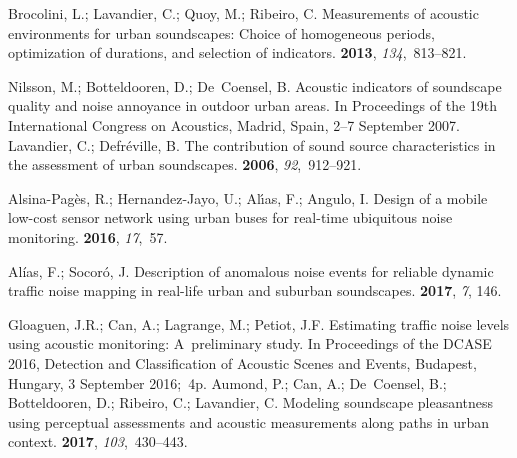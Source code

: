 \documentclass[sensors,article,accept,moreauthors,pdftex,10pt,a4paper]{mdpi}
\begin{document}
\begin{thebibliography}{999}
Brocolini, L.; Lavandier, C.; Quoy, M.; Ribeiro, C.
\newblock Measurements of acoustic environments for urban soundscapes: Choice
  of homogeneous periods, optimization of durations, and selection of
  indicators.
 {\bf 2013}, {\em 134},~813--821.

Nilsson, M.; Botteldooren, D.; De~Coensel, B.
\newblock Acoustic indicators of soundscape quality and noise annoyance in
  outdoor urban areas.
\newblock  In Proceedings of the 19th International Congress on Acoustics, {Madrid, Spain, 2--7 September} 2007.
Lavandier, C.; Defr{\'e}ville, B.
\newblock The contribution of sound source characteristics in the assessment of
  urban soundscapes.
 {\bf 2006}, {\em
  92},~912--921.

Alsina-Pag{\`e}s, R.; Hernandez-Jayo, U.; Al{\'\i}as, F.; Angulo, I.
\newblock Design of a mobile low-cost sensor network using urban buses for
  real-time ubiquitous noise monitoring.
 {\bf 2016}, {\em 17},~57.

Alías, F.; Socoró, J.
\newblock Description of anomalous noise events for reliable dynamic traffic
  noise mapping in real-life urban and suburban soundscapes.
 {\bf 2017}, {\em 7}, 146.

Gloaguen, J.R.; Can, A.; Lagrange, M.; Petiot, J.F.
\newblock Estimating traffic noise levels using acoustic monitoring: A~preliminary study.
\newblock  In Proceedings of the DCASE 2016, Detection and Classification of Acoustic Scenes and
  Events, {Budapest, Hungary, 3  September} 2016;~4p.
{Aumond, P.; Can, A.; De~Coensel, B.; Botteldooren, D.; Ribeiro, C.; Lavandier,
  C.}
\newblock Modeling soundscape pleasantness using perceptual assessments and
  acoustic measurements along paths in urban context.
 {\bf 2017}, {\em
  103},~430--443.


\end{thebibliography}
\end{document}
